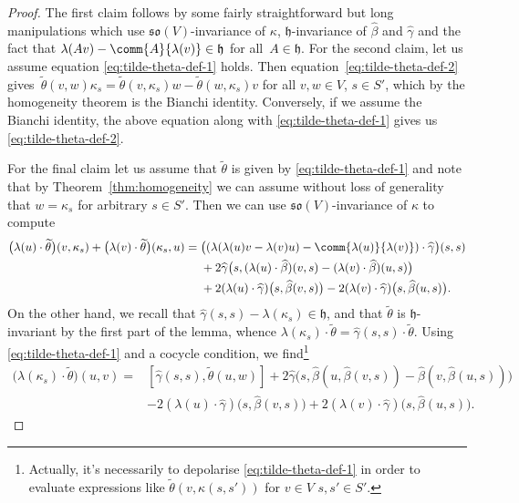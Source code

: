 \documentclass[pdftex]{sigma}
\numberwithin{equation}{section}
\newcommand{\fh}{\mathfrak{h}}
\newcommand{\fso}{\mathfrak{so}}
\newcommand{\betahat}{\widehat{\beta}}
\newcommand{\gammahat}{\widehat{\gamma}}
\newcommand{\thetatilde}{\widetilde{\theta}}
\newcommand{\1}{\mathbbm{1}}
\begin{document}
\begin{proof}
	The first claim follows by some fairly straightforward but long manipulations which use $\fso(V)$-invariance of $\kappa$, $\fh$-invariance of $\betahat$ and $\gammahat$ and the fact that $\lambda(Av)-\comm{A}{\lambda(v)}\in\fh$ for all~${A\in\fh}$. For the second claim, let us assume equation \eqref{eq:tilde-theta-def-1} holds. Then equation~\eqref{eq:tilde-theta-def-2} gives~${\thetatilde(v,w)\kappa_s = \thetatilde(v,\kappa_s)w - \thetatilde(w,\kappa_s)v}
$
	for all $v,w\in V$, $s\in S'$, which by the homogeneity theorem is the Bianchi identity. Conversely, if we assume the Bianchi identity, the above equation along with \eqref{eq:tilde-theta-def-1} gives us \eqref{eq:tilde-theta-def-2}.
	
	For the final claim let us assume that $\thetatilde$ is given by \eqref{eq:tilde-theta-def-1} and note that by Theorem~\ref{thm:homogeneity} we can assume without loss of generality that $w=\kappa_s$ for arbitrary $s\in S'$. Then we can use $\fso(V)$-invariance of $\kappa$ to compute
	\begin{align*}
		\bigl(\lambda(u)\cdot\thetatilde\bigr)(v,\kappa_s) + \bigl(\lambda(v)\cdot\thetatilde\bigr)(\kappa_s,u)
			={}& \bigl((\lambda(\lambda(u)v-\lambda(v)u)
				- \comm{\lambda(u)}{\lambda(v)})\cdot\gammahat\bigr)(s,s) \\
				& + 2\gammahat\bigl(s,(\lambda(u)\cdot\betahat)(v,s)
				- (\lambda(v)\cdot\betahat)(u,s)\bigr)\\
				& + 2(\lambda(u)\cdot\gammahat)\bigl(s,\betahat(v,s)\bigr)
				- 2(\lambda(v)\cdot\gammahat)\bigl(s,\betahat(u,s)\bigr).
	\end{align*}
	On the other hand, we recall that $\gammahat(s,s)-\lambda(\kappa_s)\in\fh$, and that $\thetatilde$ is $\fh$-invariant by the first part of the lemma, whence $\lambda(\kappa_s)\cdot\thetatilde=\gammahat(s,s)\cdot\thetatilde$. Using \eqref{eq:tilde-theta-def-1} and a cocycle condition, we find\footnote{Actually, it's necessarily to depolarise \eqref{eq:tilde-theta-def-1} in order to evaluate expressions like $\thetatilde(v,\kappa(s,s'))$ for $v\in V$ $s,s'\in S'$.}
	\begin{align*}
		\bigl(\lambda(\kappa_s)\cdot\thetatilde\bigr)(u,v) ={}& [\gammahat(s,s),\thetatilde(u,w)]
			+ 2\gammahat\bigl(s,\betahat(u,\betahat(v,s))-\betahat(v,\betahat(u,s))\bigr)\\
			& - 2(\lambda(u)\cdot\gammahat)\bigl(s,\betahat(v,s)\bigr)
			+ 2(\lambda(v)\cdot\gammahat)\bigl(s,\betahat(u,s)\bigr).
	\end{align*}

\end{proof}
\end{document}
